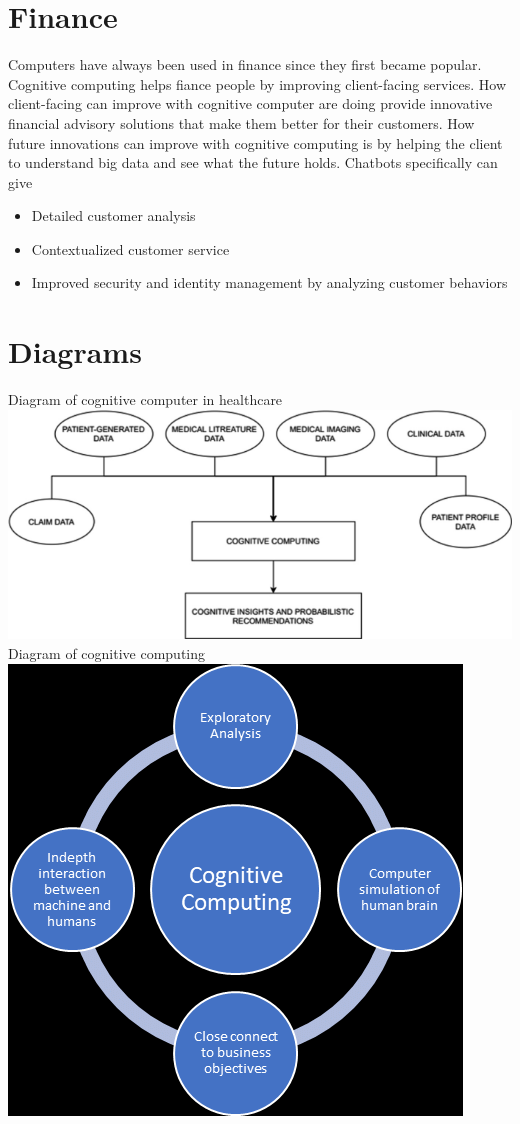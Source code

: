 \documentclass{article}
\begin{document}
\section{Finance}
Computers have always been used in finance since they first became popular. Cognitive computing helps fiance people by improving client-facing services. How client-facing can improve with cognitive computer are doing provide innovative financial advisory solutions that make them better for their customers. How future innovations can improve with cognitive computing is by helping the client to understand big data and see what the future holds.
Chatbots specifically can give
\begin{itemize}
    \item Detailed customer analysis
    \item Contextualized customer service
    \item Improved security and identity management by analyzing customer behaviors
\end{itemize} \cite{pulse}

\section{Diagrams}
Diagram of cognitive computer in healthcare \\
\includegraphics[scale=0.5]{Healthcare} \\
Diagram of cognitive computing \\
\includegraphics[scale=0.5]{Cognitive} \\

\break

\end{document}
